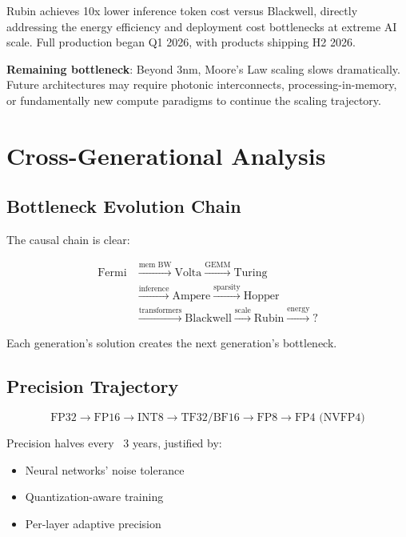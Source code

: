 \documentclass{article}
\begin{document}
Rubin achieves 10x lower inference token cost versus Blackwell, directly addressing the energy efficiency and deployment cost bottlenecks at extreme AI scale. Full production began Q1 2026, with products shipping H2 2026.

\textbf{Remaining bottleneck}: Beyond 3nm, Moore's Law scaling slows dramatically. Future architectures may require photonic interconnects, processing-in-memory, or fundamentally new compute paradigms to continue the scaling trajectory.

\section{Cross-Generational Analysis}

\subsection{Bottleneck Evolution Chain}

The causal chain is clear:

\begin{equation}
\begin{aligned}
\text{Fermi} &\xrightarrow{\text{mem BW}} \text{Volta} \xrightarrow{\text{GEMM}} \text{Turing} \\
&\xrightarrow{\text{inference}} \text{Ampere} \xrightarrow{\text{sparsity}} \text{Hopper} \\
&\xrightarrow{\text{transformers}} \text{Blackwell} \xrightarrow{\text{scale}} \text{Rubin} \xrightarrow{\text{energy}} \text{?}
\end{aligned}
\end{equation}

Each generation's solution creates the next generation's bottleneck.

\subsection{Precision Trajectory}

\begin{equation}
\text{FP32} \to \text{FP16} \to \text{INT8} \to \text{TF32/BF16} \to \text{FP8} \to \text{FP4 (NVFP4)}
\end{equation}

Precision halves every ~3 years, justified by:
\begin{itemize}
\item Neural networks' noise tolerance
\item Quantization-aware training
\item Per-layer adaptive precision
\end{itemize}
\end{document}
